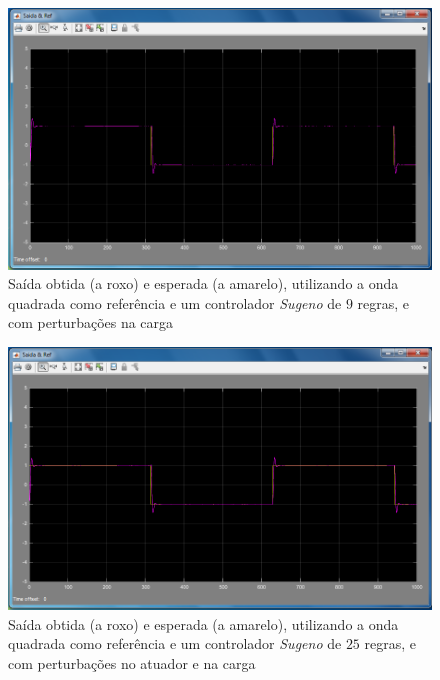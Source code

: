 \documentclass{article}
\begin{document}
\begin{figure}[h]
  \centering
      \includegraphics[scale=0.3]{Images/Sugeno_25_square_charge.png}
  \caption{Saída obtida (a roxo) e esperada (a amarelo), utilizando a onda quadrada como referência e um controlador \emph{Sugeno} de $9$ regras, e com perturbações na carga}
\end{figure}

\begin{figure}[h]
  \centering
      \includegraphics[scale=0.3]{Images/Sugeno_25_square_actuator_charge.png}
  \caption{Saída obtida (a roxo) e esperada (a amarelo), utilizando a onda quadrada como referência e um controlador \emph{Sugeno} de $25$ regras, e com perturbações no atuador e na carga}
\end{figure}

\end{document}
